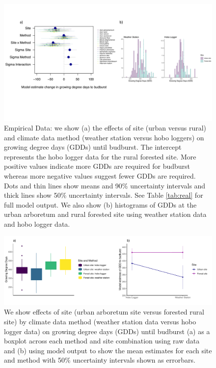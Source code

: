 \documentclass{article}\usepackage[]{graphicx}\usepackage[]{color}
\begin{document}
\begin{figure}[H]
    \centering
    \includegraphics[width=16cm, trim=0cm 5cm 0cm 0cm,]{..//analyses/figures/muandgdd.pdf}
\caption{ Empirical Data: we show (a) the effects of site (urban versus rural) and climate data method (weather station versus hobo loggers) on growing degree days (GDDs) until budburst. The intercept represents the hobo logger data for the rural forested site. More positive values indicate more GDDs are required for budburst whereas more negative values suggest fewer GDDs are required. Dots and thin lines show means and 90\% uncertainty intervals and thick lines show 50\% uncertainty intervals. See Table \ref{tab:real} for full model output. We also show (b) histograms of GDDs at the urban arboretum and rural forested site using weather station data and hobo logger data.}
\label{fig:real}
\end{figure}

\begin{figure}[H]
      \centering
      \includegraphics[width=16cm]{..//analyses/figures/gdd_interaction.pdf}
\caption{ We show effects of site (urban arboretum site versus forested rural site) by climate data method (weather station data versus hobo logger data) on growing degree days (GDDs) until budburst (a) as a boxplot across each method and site combination using raw data and (b) using model output to show the mean estimates for each site and method with 50\% uncertainty intervals shown as errorbars.}
\label{fig:interaction}
\end{figure}



  
  
\end{document}

